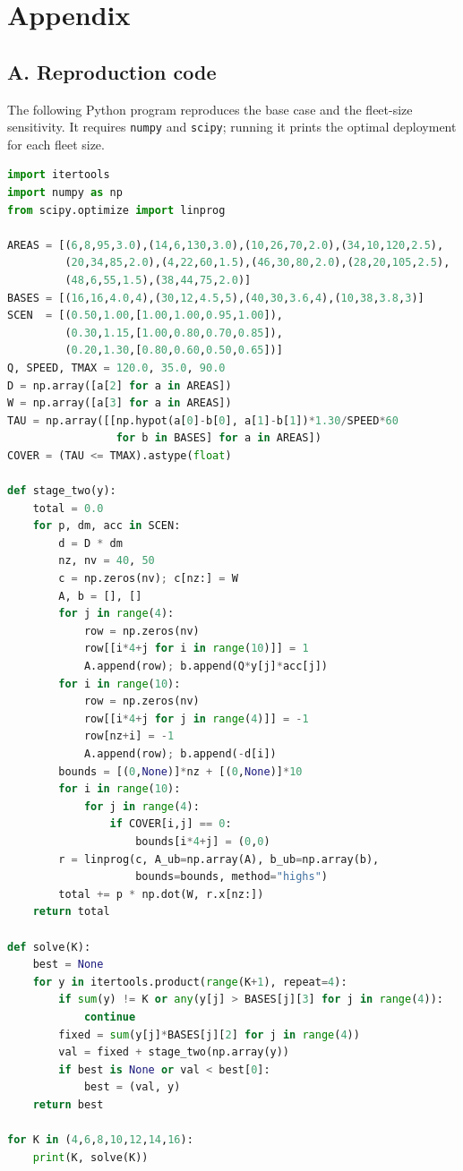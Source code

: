 \documentclass{apmcmthesis}
\begin{document}
\newpage
\section*{Appendix}

\subsection*{A. Reproduction code}

The following Python program reproduces the base case and the fleet-size sensitivity. It requires \texttt{numpy} and \texttt{scipy}; running it prints the optimal deployment for each fleet size.

\begin{lstlisting}[language=Python,caption={Core code for the two-stage model (abridged).}]
import itertools
import numpy as np
from scipy.optimize import linprog

AREAS = [(6,8,95,3.0),(14,6,130,3.0),(10,26,70,2.0),(34,10,120,2.5),
         (20,34,85,2.0),(4,22,60,1.5),(46,30,80,2.0),(28,20,105,2.5),
         (48,6,55,1.5),(38,44,75,2.0)]
BASES = [(16,16,4.0,4),(30,12,4.5,5),(40,30,3.6,4),(10,38,3.8,3)]
SCEN  = [(0.50,1.00,[1.00,1.00,0.95,1.00]),
         (0.30,1.15,[1.00,0.80,0.70,0.85]),
         (0.20,1.30,[0.80,0.60,0.50,0.65])]
Q, SPEED, TMAX = 120.0, 35.0, 90.0
D = np.array([a[2] for a in AREAS])
W = np.array([a[3] for a in AREAS])
TAU = np.array([[np.hypot(a[0]-b[0], a[1]-b[1])*1.30/SPEED*60
                 for b in BASES] for a in AREAS])
COVER = (TAU <= TMAX).astype(float)

def stage_two(y):
    total = 0.0
    for p, dm, acc in SCEN:
        d = D * dm
        nz, nv = 40, 50
        c = np.zeros(nv); c[nz:] = W
        A, b = [], []
        for j in range(4):
            row = np.zeros(nv)
            row[[i*4+j for i in range(10)]] = 1
            A.append(row); b.append(Q*y[j]*acc[j])
        for i in range(10):
            row = np.zeros(nv)
            row[[i*4+j for j in range(4)]] = -1
            row[nz+i] = -1
            A.append(row); b.append(-d[i])
        bounds = [(0,None)]*nz + [(0,None)]*10
        for i in range(10):
            for j in range(4):
                if COVER[i,j] == 0:
                    bounds[i*4+j] = (0,0)
        r = linprog(c, A_ub=np.array(A), b_ub=np.array(b),
                    bounds=bounds, method="highs")
        total += p * np.dot(W, r.x[nz:])
    return total

def solve(K):
    best = None
    for y in itertools.product(range(K+1), repeat=4):
        if sum(y) != K or any(y[j] > BASES[j][3] for j in range(4)):
            continue
        fixed = sum(y[j]*BASES[j][2] for j in range(4))
        val = fixed + stage_two(np.array(y))
        if best is None or val < best[0]:
            best = (val, y)
    return best

for K in (4,6,8,10,12,14,16):
    print(K, solve(K))
\end{lstlisting}
\end{document}
